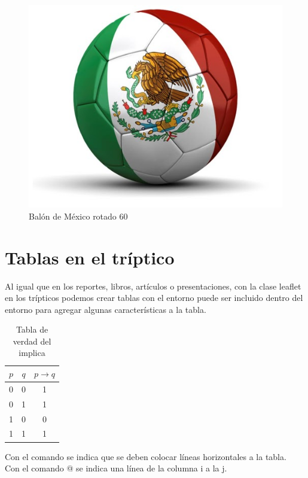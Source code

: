 \documentclass[10pt, notumble, letterpaper]{leaflet}
\begin{document}
\begin{figure}[h!]
\centering
\includegraphics[angle=60,scale=0.3]{balondeMexico}
\caption{Balón de México rotado 60}
\end{figure}


\newpage
\section{Tablas en el tríptico}

Al igual que en los reportes, libros, artículos o presentaciones, con la clase leaflet en los trípticos podemos crear tablas con el entorno \verb@tabular@ puede ser incluido dentro del entorno \verb@table@ para agregar algunas características a la tabla.
\begin{table}[h!]
\centering
\begin{tabular}{|c|c|c|} \hline
$p$ & $q$ & $p \rightarrow q$\\\hline
0 & 0 & 1 \\
0 & 1 & 1 \\
1 & 0 & 0 \\
1 & 1 & 1 \\\hline
\end{tabular}
\caption{Tabla de verdad del implica}
\end{table}

Con el comando \verb@\hline@ se indica que se deben colocar líneas horizontales a la tabla.\\
Con el comando \verb@{}@ se indica una línea de la columna i a la j.
\end{document}
